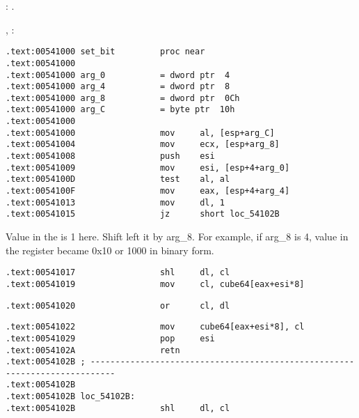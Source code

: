 : .

, :

\begin{lstlisting}
.text:00541000 set_bit         proc near
.text:00541000
.text:00541000 arg_0           = dword ptr  4
.text:00541000 arg_4           = dword ptr  8
.text:00541000 arg_8           = dword ptr  0Ch
.text:00541000 arg_C           = byte ptr  10h
.text:00541000
.text:00541000                 mov     al, [esp+arg_C]
.text:00541004                 mov     ecx, [esp+arg_8]
.text:00541008                 push    esi
.text:00541009                 mov     esi, [esp+4+arg_0]
.text:0054100D                 test    al, al
.text:0054100F                 mov     eax, [esp+4+arg_4]
.text:00541013                 mov     dl, 1
.text:00541015                 jz      short loc_54102B
\end{lstlisting}

{Value in the  is 1 here. Shift left it by arg\_8.
For example, if arg\_8 is 4, value in the  register became 
0x10 or 1000 in binary form.}

\begin{lstlisting}
.text:00541017                 shl     dl, cl
.text:00541019                 mov     cl, cube64[eax+esi*8]
\end{lstlisting}


\begin{lstlisting}
.text:00541020                 or      cl, dl
\end{lstlisting}


\begin{lstlisting}
.text:00541022                 mov     cube64[eax+esi*8], cl
.text:00541029                 pop     esi
.text:0054102A                 retn
.text:0054102B ; ---------------------------------------------------------------------------
.text:0054102B
.text:0054102B loc_54102B:
.text:0054102B                 shl     dl, cl
\end{lstlisting}

